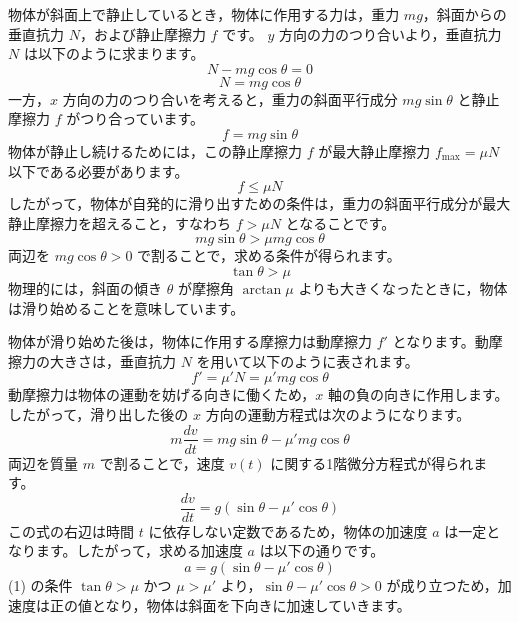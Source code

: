 \solutionheading
\begin{solutionparts}

物体が斜面上で静止しているとき，物体に作用する力は，重力 $mg$，斜面からの垂直抗力 $N$，および静止摩擦力 $f$ です。 $y$ 方向の力のつり合いより，垂直抗力 $N$ は以下のように求まります。
\begin{equation*}
N - m g \cos \theta = 0
\end{equation*}
\begin{equation*}
N = m g \cos \theta
\end{equation*}
一方，$x$ 方向の力のつり合いを考えると，重力の斜面平行成分 $m g \sin \theta$ と静止摩擦力 $f$ がつり合っています。
\begin{equation*}
f = m g \sin \theta
\end{equation*}
物体が静止し続けるためには，この静止摩擦力 $f$ が最大静止摩擦力 $f_{\text{max}} = \mu N$ 以下である必要があります。
\begin{equation*}
f \le \mu N
\end{equation*}
したがって，物体が自発的に滑り出すための条件は，重力の斜面平行成分が最大静止摩擦力を超えること，すなわち $f > \mu N$ となることです。
\begin{equation*}
m g \sin \theta > \mu m g \cos \theta
\end{equation*}
両辺を $m g \cos \theta > 0$ で割ることで，求める条件が得られます。
\begin{equation*}
\tan \theta > \mu
\end{equation*}
物理的には，斜面の傾き $\theta$ が摩擦角 $\arctan \mu$ よりも大きくなったときに，物体は滑り始めることを意味しています。

物体が滑り始めた後は，物体に作用する摩擦力は動摩擦力 $f'$ となります。動摩擦力の大きさは，垂直抗力 $N$ を用いて以下のように表されます。
\begin{equation*}
f' = \mu' N = \mu' m g \cos \theta
\end{equation*}
動摩擦力は物体の運動を妨げる向きに働くため，$x$ 軸の負の向きに作用します。 したがって，滑り出した後の $x$ 方向の運動方程式は次のようになります。
\begin{equation*}
m \frac{dv}{dt} = m g \sin \theta - \mu' m g \cos \theta
\end{equation*}
両辺を質量 $m$ で割ることで，速度 $v(t)$ に関する1階微分方程式が得られます。
\begin{equation*}
\frac{dv}{dt} = g (\sin \theta - \mu' \cos \theta)
\end{equation*}
この式の右辺は時間 $t$ に依存しない定数であるため，物体の加速度 $a$ は一定となります。したがって，求める加速度 $a$ は以下の通りです。
\begin{equation*}
a = g (\sin \theta - \mu' \cos \theta)
\end{equation*}
(1) の条件 $\tan \theta > \mu$ かつ $\mu > \mu'$ より，$\sin \theta - \mu' \cos \theta > 0$ が成り立つため，加速度は正の値となり，物体は斜面を下向きに加速していきます。


\end{solutionparts}
